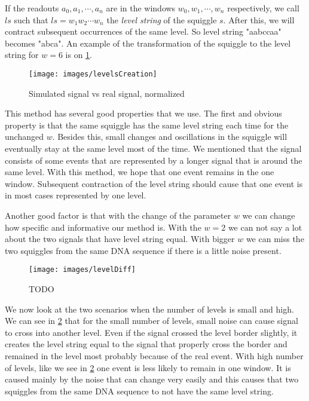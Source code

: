 If the readouts $a_0, a_1, \cdots, a_n$ are in the windows $w_0, w_1, \cdots ,w_n$
respectively, we call $ls$ such that $ls=w_1w_2\cdots w_n$ the \textit{level string} of the
squiggle $s$. After this, we will contract subsequent occurrences of the same level.
So level string "aabccaa" becomes "abca". An example of the transformation of the squiggle
to the level string for $w=6$ is on \ref{obr:levelsCreation}.

\begin{figure}
\centerline{\texttt{[image: images/levelsCreation]}}
\caption[TODO]{Simulated signal vs real signal, normalized}
\label{obr:levelsCreation}
\end{figure}

This method has several good properties that we use. The first and obvious
property is that the same squiggle has the same level string each time for the
unchanged $w$. Besides this, small changes and oscillations in the squiggle will
eventually stay at the same level most of the time. We mentioned that the signal
consists of some events that are represented by a longer signal that is around the same level.
With this method, we hope that one event remains in the one window. Subsequent
contraction of the level string should cause that one event is in most cases represented by
one level.

Another good factor is that with the change of the parameter $w$ we can change how specific
and informative our method is. With the $w=2$ we can not say a lot about the two signals
that have level string equal. With bigger $w$ we can miss the two squiggles from
the same DNA sequence if there is a little noise present.

\begin{figure}
\centerline{\texttt{[image: images/levelDiff]}}
\caption[TODO]{TODO}
\label{obr:levelDiff}
\end{figure}

We now look at the two scenarios when the number of levels is small and high.
We can see in \ref{obr:levelDiff} that for the small number of levels, small noise can cause signal to cross into another level. Even if the signal crossed the level border slightly, it creates the level
string equal to the signal that properly cross the border and remained in the level
most probably because of the real event. With high number of levels, like we see in \ref{obr:levelDiff} one event is less likely to remain in one window. It is caused mainly by the noise that can change very easily and this causes that
two squiggles from the same DNA sequence to not have the same level string.

